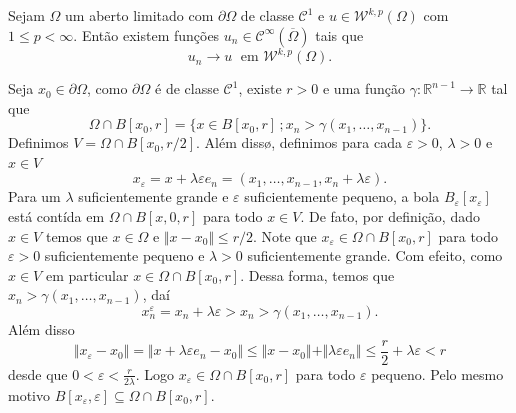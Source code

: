 \documentclass[a4paper, 11pt]{book}
\theoremstyle{definition}
\newcommand{\bR}{\mathbb{R}}
\newcommand{\cC}{\mathcal{C}}
\newcommand{\cW}{\mathcal{W}}
\begin{document}
\begin{tbox}
    Sejam $\Omega$ um aberto limitado com $\partial \Omega$ de classe $\cC^1$ e $u \in \cW^{k,p}(\Omega)$ com $1 \leqslant p < \infty$.
    Então existem funções $u_n \in \cC^\infty(\overline\Omega)$ tais que
    \[
        u_n \to u \;\text{ em } \cW^{k,p}(\Omega).
    \]
\end{tbox}
\begin{prf}
    Seja $x_0 \in \partial \Omega$, como $\partial \Omega$ é de classe $\cC^1$, existe $r > 0$ e uma função $\gamma : \bR^{n-1} \to \bR$ tal que
    \[
        \Omega \cap B[x_0, r] = \{x \in B[x_0, r] \,; x_n > \gamma(x_1,\dots,x_{n-1})\}.
    \]
    Definimos $V = \Omega \cap B[x_0, r/2]$.
    Além dissø, definimos para cada $\varepsilon > 0$, $\lambda > 0$ e $x \in V$
    \[
        x_\varepsilon = x + \lambda \varepsilon e_n = (x_1,\dots,x_{n-1}, x_n + \lambda\varepsilon).
    \]
    Para um $\lambda$ suficientemente grande e $\varepsilon$ suficientemente pequeno, a bola $B_\varepsilon[x_\varepsilon]$ está contída em $\Omega \cap B[x,0,r]$ para todo $x \in V$.
    De fato, por definição, dado $x \in V$ temos que $x \in \Omega$ e $\Vert x - x_0 \Vert \leqslant r/2$.
    Note que $x_\varepsilon \in \Omega \cap B[x_0, r]$ para todo $\varepsilon > 0$ suficientemente pequeno e $\lambda > 0$ suficientemente grande.
    Com efeito, como $x \in V$ em particular $x \in \Omega \cap B[x_0, r]$.
    Dessa forma, temos que $x_n > \gamma(x_1,\dots,x_{n-1})$, daí
    \[
        x^\varepsilon_n = x_n + \lambda \varepsilon > x_n >  \gamma(x_{1},\dots,x_{n-1}).
    \]
    Além disso
    \[
        \Vert x_\varepsilon - x_0 \Vert = \Vert x + \lambda \varepsilon e_n - x_0 \Vert \leqslant \Vert x - x_0 \Vert + \Vert \lambda \varepsilon e_n  \Vert \leqslant \frac{r}{2} + \lambda\varepsilon < r
    \]
    desde que $0 <\varepsilon < \frac{r}{2\lambda}$.
    Logo $x_\varepsilon \in \Omega \cap B[x_0, r]$ para todo $\varepsilon$ pequeno.
    Pelo mesmo motivo
    $B[x_\varepsilon, \varepsilon] \subseteq \Omega \cap B[x_0,r]$.


\end{prf}
\end{document}
